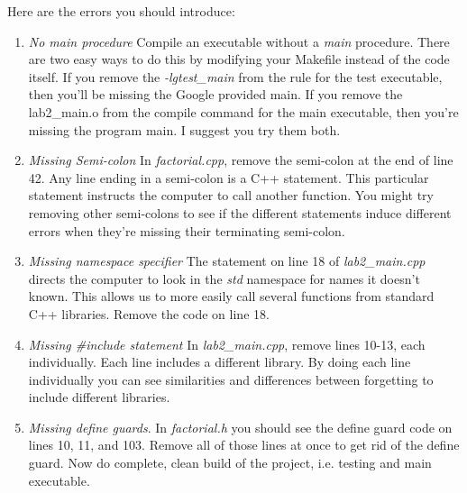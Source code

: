\documentclass[]{tufte-handout}
\begin{document}
Here are the errors you should introduce:
\begin{enumerate}

\item \textit{No main procedure} \newline
Compile an executable without a \textit{main} procedure. There are two easy ways to do this by modifying your Makefile instead of the code itself.  If you remove the \textit{-lgtest\_main} from the rule for the test executable, then you'll be missing the Google provided main. If you remove the lab2\_main.o from the compile command for the main executable, then you're missing the program main.  I suggest you try them both.

\item \textit{Missing Semi-colon} \newline
In \textit{factorial.cpp}, remove the semi-colon at the end of line 42. Any line ending in a semi-colon is a C++ statement. This particular statement instructs the computer to call another function. You might try removing other semi-colons to see if the different statements induce different errors when they're missing their terminating semi-colon.

\item \textit{Missing namespace specifier} \newline
The statement on line 18 of \textit{lab2\_main.cpp} directs the computer to look in the \textit{std} namespace for names it doesn't known. This allows us to more easily call several functions from standard C++ libraries. Remove the code on line 18.

\item \textit{Missing \#include statement} \newline
In \textit{lab2\_main.cpp}, remove lines 10-13, each individually. Each line includes a different library. By doing each line individually you can see similarities and differences between forgetting to include different libraries.

\item \textit{Missing define guards}. \newline
In \textit{factorial.h} you should see the define guard code on lines 10, 11, and 103.  Remove all of those lines at once to get rid of the define guard. Now do complete, clean build of the project, i.e. testing and main executable. 


\end{enumerate}
\end{document}
